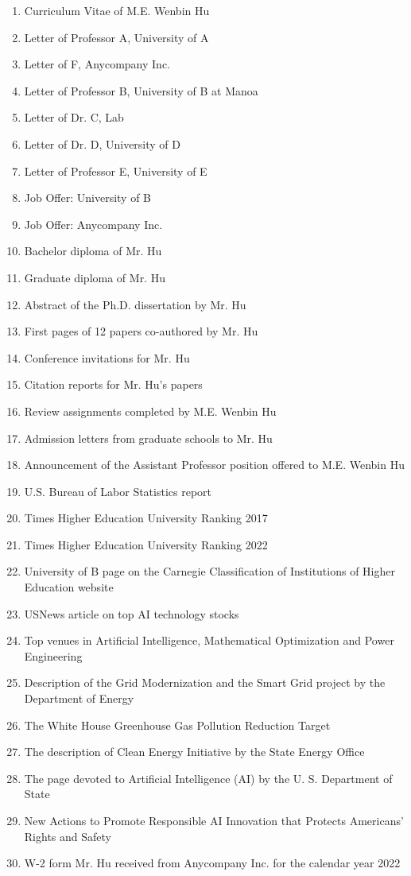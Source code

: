 \documentclass{article}
\begin{document}
\begin{enumerate}[label={Exhibit \arabic*:}]
    \item Curriculum Vitae of M.E. Wenbin Hu 
    \item Letter of Professor A, University of A 
    \item Letter of F, Anycompany Inc. 
    \item Letter of Professor B, University of B at Manoa 
    \item Letter of Dr. C, Lab 
    \item Letter of Dr. D, University of D 
    \item Letter of Professor E, University of E
    \item Job Offer: University of B
    \item Job Offer: Anycompany Inc.
    \item Bachelor diploma of Mr. Hu 
    \item Graduate diploma of Mr. Hu 
    \item Abstract of the Ph.D. dissertation by Mr. Hu 
    \item First pages of 12 papers co-authored by Mr. Hu 
    \item Conference invitations for Mr. Hu 
    \item Citation reports for Mr. Hu’s papers 
    \item Review assignments completed by M.E. Wenbin Hu 
    \item Admission letters from graduate schools to Mr. Hu 
    \item Announcement of the Assistant Professor position offered to M.E. Wenbin Hu 
    \item U.S. Bureau of Labor Statistics report 
    \item Times Higher Education University Ranking 2017 
    \item Times Higher Education University Ranking 2022 
    \item University of B page on the Carnegie Classification of Institutions of Higher Education website 
    \item USNews article on top AI technology stocks 
    \item Top venues in Artificial Intelligence, Mathematical Optimization and Power Engineering 
    \item Description of the Grid Modernization and the Smart Grid project by the Department of Energy 
    \item The White House Greenhouse Gas Pollution Reduction Target 
    \item The description of Clean Energy Initiative by the State Energy Office 
    \item The page devoted to Artificial Intelligence (AI) by the U. S. Department of State
    \item New Actions to Promote Responsible AI Innovation that Protects Americans’ Rights and Safety 
    \item W-2 form Mr. Hu received from Anycompany Inc. for the calendar year 2022
\end{enumerate}
\end{document}
